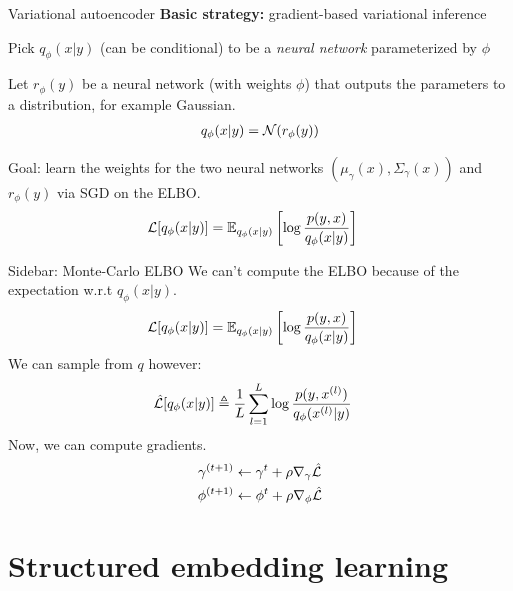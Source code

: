 \documentclass[10pt, compress]{beamer}
\begin{document}
\begin{frame}{Variational autoencoder}
  \textbf{Basic strategy:} gradient-based variational inference

  \pause

  \begin{center}
      \begin{framed}
       Pick $q_\phi(x | y)$ (can be conditional) to be a \emph{neural network}
          parameterized by $\phi$
      \end{framed}
  \end{center}

  \pause
  Let $r_\phi(y)$ be a neural network (with weights $\phi$)
  that outputs the parameters to a distribution, for example Gaussian.
  \begin{align*}
    q_\phi(x | y) = \mathcal{N}(r_\phi(y))
  \end{align*}

  \pause
  Goal: learn the weights for the two neural networks $(\mu_\gamma(x), \Sigma_\gamma(x))$ and $r_\phi(y)$
  via SGD on the ELBO.
  \pause
  \begin{align*}
    \mathcal{L}[q_\phi(x | y)] &= \mathbb{E}_{q_\phi(x | y)}\left[\log\frac{p(y, x)}{q_\phi(x | y)}\right]
  \end{align*}
\end{frame}

\begin{frame}{Sidebar: Monte-Carlo ELBO}
  We can't compute the ELBO because of the expectation w.r.t $q_\phi(x|y)$.
  \begin{align*}
    \mathcal{L}[q_\phi(x | y)] &= \mathbb{E}_{q_\phi(x | y)}\left[\log \frac{p(y, x)}{q_\phi(x | y)}\right]
  \end{align*}
  We can sample from $q$ however:
  \begin{align*}
    \hat{\mathcal{L}}[q_\phi(x | y)] &\triangleq \frac{1}{L}\sum_{l = 1}^L \log \frac{p(y, x^{(l)})}{q_\phi(x^{(l)} | y)}
  \end{align*}
  Now, we can compute gradients.
  \begin{align*}
    \gamma^{(t + 1)} &\leftarrow \gamma^t + \rho \nabla_\gamma \hat{\mathcal{L}} \\
    \phi^{(t + 1)} &\leftarrow \phi^t + \rho \nabla_\phi \hat{\mathcal{L}} \\
  \end{align*}
\end{frame}

\section{Structured embedding learning}
\end{document}
